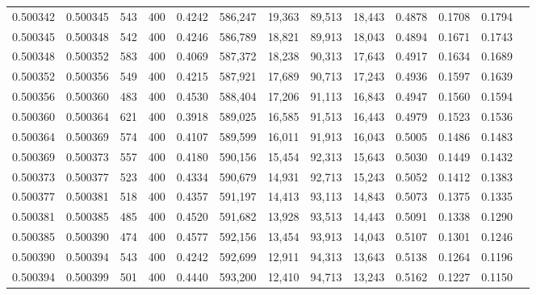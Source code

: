 \begin{tabular}{rrrrrrrrrrrrr}
0.500342 & 0.500345 &    543 & 400 &                                     0.4242 & 586,247 &  19,363 &  89,513 &  18,443 & 0.4878 & 0.1708 & 0.1794 \\
0.500345 & 0.500348 &    542 & 400 &                                     0.4246 & 586,789 &  18,821 &  89,913 &  18,043 & 0.4894 & 0.1671 & 0.1743 \\
0.500348 & 0.500352 &    583 & 400 &                                     0.4069 & 587,372 &  18,238 &  90,313 &  17,643 & 0.4917 & 0.1634 & 0.1689 \\
0.500352 & 0.500356 &    549 & 400 &                                     0.4215 & 587,921 &  17,689 &  90,713 &  17,243 & 0.4936 & 0.1597 & 0.1639 \\
0.500356 & 0.500360 &    483 & 400 &                                     0.4530 & 588,404 &  17,206 &  91,113 &  16,843 & 0.4947 & 0.1560 & 0.1594 \\
0.500360 & 0.500364 &    621 & 400 &                                     0.3918 & 589,025 &  16,585 &  91,513 &  16,443 & 0.4979 & 0.1523 & 0.1536 \\
0.500364 & 0.500369 &    574 & 400 &                                     0.4107 & 589,599 &  16,011 &  91,913 &  16,043 & 0.5005 & 0.1486 & 0.1483 \\
0.500369 & 0.500373 &    557 & 400 &                                     0.4180 & 590,156 &  15,454 &  92,313 &  15,643 & 0.5030 & 0.1449 & 0.1432 \\
0.500373 & 0.500377 &    523 & 400 &                                     0.4334 & 590,679 &  14,931 &  92,713 &  15,243 & 0.5052 & 0.1412 & 0.1383 \\
0.500377 & 0.500381 &    518 & 400 &                                     0.4357 & 591,197 &  14,413 &  93,113 &  14,843 & 0.5073 & 0.1375 & 0.1335 \\
0.500381 & 0.500385 &    485 & 400 &                                     0.4520 & 591,682 &  13,928 &  93,513 &  14,443 & 0.5091 & 0.1338 & 0.1290 \\
0.500385 & 0.500390 &    474 & 400 &                                     0.4577 & 592,156 &  13,454 &  93,913 &  14,043 & 0.5107 & 0.1301 & 0.1246 \\
0.500390 & 0.500394 &    543 & 400 &                                     0.4242 & 592,699 &  12,911 &  94,313 &  13,643 & 0.5138 & 0.1264 & 0.1196 \\
0.500394 & 0.500399 &    501 & 400 &                                     0.4440 & 593,200 &  12,410 &  94,713 &  13,243 & 0.5162 & 0.1227 & 0.1150 \\

\end{tabular}
